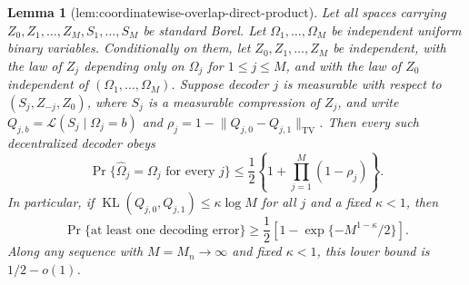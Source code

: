 \documentclass{article}
\newtheorem{lemma}{Lemma}
\begin{document}
\begin{lemma}[lem:coordinatewise-overlap-direct-product]\label{lem:coordinatewise-overlap-direct-product}
Let all spaces carrying \(Z_0,Z_1,\ldots,Z_M,S_1,\ldots,S_M\) be standard Borel.  Let \(\Omega_1,\ldots,\Omega_M\) be independent uniform binary variables.  Conditionally on them, let \(Z_0,Z_1,\ldots,Z_M\) be independent, with the law of \(Z_j\) depending only on \(\Omega_j\) for \(1\leq j\leq M\), and with the law of \(Z_0\) independent of \((\Omega_1,\ldots,\Omega_M)\).  Suppose decoder \(j\) is measurable with respect to \((S_j,Z_{-j},Z_0)\), where \(S_j\) is a measurable compression of \(Z_j\), and write \(Q_{j,b}=\mathcal L(S_j\mid\Omega_j=b)\) and \(\rho_j=1-\lVert Q_{j,0}-Q_{j,1}\rVert_{\mathrm{TV}}\).  Then every such decentralized decoder obeys
\[
 \Pr\{\widehat\Omega_j=\Omega_j\text{ for every }j\}
 \leq\frac12\left\{1+\prod_{j=1}^M(1-\rho_j)\right\}.
\]
In particular, if \(\operatorname{KL}(Q_{j,0},Q_{j,1})\leq\kappa\log M\) for all \(j\) and a fixed \(\kappa<1\), then
\[
 \Pr\{\text{at least one decoding error}\}
 \geq\frac12\left[1-\exp\{-M^{1-\kappa}/2\}\right].
\]
Along any sequence with \(M=M_n\to\infty\) and fixed \(\kappa<1\), this lower bound is \(1/2-o(1)\).
\end{lemma}
\end{document}
